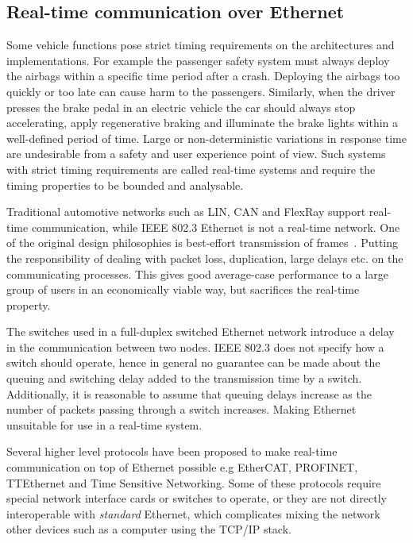 \subsection{Real-time communication over Ethernet}
\label{sec:real-time-comm}
Some vehicle functions pose strict timing requirements on the architectures and implementations. For example the passenger safety system must always deploy the airbags within a specific time period after a crash. Deploying the airbags too quickly or too late can cause harm to the passengers. Similarly, when the driver presses the brake pedal in an electric vehicle the car should always stop accelerating, apply regenerative braking and illuminate the brake lights within a well-defined period of time. Large or non-deterministic variations in response time are undesirable from a safety and user experience point of view. Such systems with strict timing requirements are called real-time systems and require the timing properties to be bounded and analysable. 

Traditional automotive networks such as LIN, CAN and FlexRay support real-time communication, while IEEE 802.3 Ethernet is not a real-time network. One of the original design philosophies is best-effort transmission of frames~\cite{metcalfe1976ethernet}. Putting the responsibility of dealing with packet loss, duplication, large delays etc. on the communicating processes. This gives good average-case performance to a large group of users in an economically viable way, but sacrifices the real-time property.

The switches used in a full-duplex switched Ethernet network introduce a delay in the communication between two nodes. IEEE 802.3 does not specify how a switch should operate, hence in general no guarantee can be made about the queuing and switching delay added to the transmission time by a switch. Additionally, it is reasonable to assume that queuing delays increase as the number of packets passing through a switch increases. Making Ethernet unsuitable for use in a real-time system. 

Several higher level protocols have been proposed to make real-time communication on top of Ethernet possible e.g EtherCAT, PROFINET, TTEthernet and Time Sensitive Networking. Some of these protocols require special network interface cards or switches to operate, or they are not directly interoperable with \textit{standard} Ethernet, which complicates mixing the network other devices such as a computer using the TCP/IP stack.